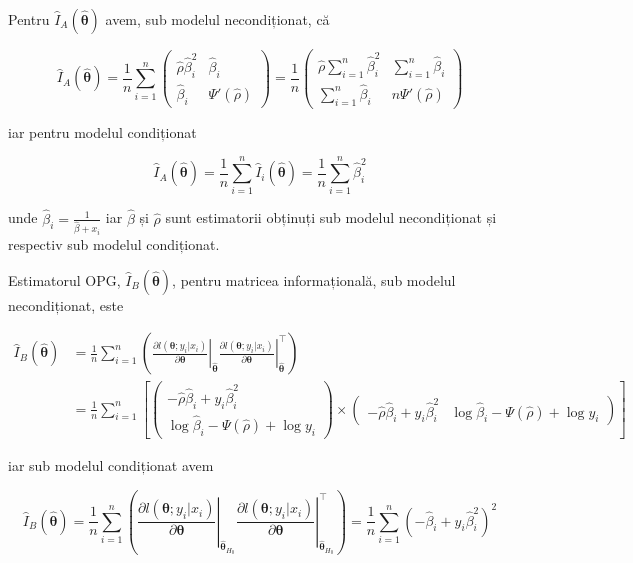 \documentclass[]{article}
\begin{document}
Pentru \(\hat{I}_{A}(\hat{\boldsymbol{\theta}})\) avem, sub modelul
necondiționat, că

\[
\hat{I}_{A}(\hat{\boldsymbol{\theta}}) = \frac{1}{n}\sum_{i = 1}^{n}\begin{pmatrix}\hat{\rho}\hat{\beta}_i^2 & \hat{\beta}_i\\ \hat{\beta}_i & \Psi'(\hat{\rho})\end{pmatrix} = \frac{1}{n}\begin{pmatrix}\hat{\rho}\sum_{i = 1}^{n}\hat{\beta}_i^2 & \sum_{i = 1}^{n}\hat{\beta}_i\\ \sum_{i = 1}^{n}\hat{\beta}_i & n\Psi'(\hat{\rho})\end{pmatrix}
\]

iar pentru modelul condiționat

\[
\hat{I}_{A}(\hat{\boldsymbol{\theta}}) = \frac{1}{n}\sum_{i = 1}^{n}\hat{I}_{i}(\hat{\boldsymbol{\theta}}) = \frac{1}{n}\sum_{i = 1}^{n} \hat{\beta}_{i}^2
\]

unde \(\hat{\beta}_i = \frac{1}{\hat{\beta} + x_i}\) iar \(\hat{\beta}\)
și \(\hat{\rho}\) sunt estimatorii obținuți sub modelul necondiționat și
respectiv sub modelul condiționat.

Estimatorul OPG, \(\hat{I}_{B}(\hat{\boldsymbol{\theta}})\), pentru
matricea informațională, sub modelul necondiționat, este

\begin{align*}
\hat{I}_{B}(\hat{\boldsymbol{\theta}}) &= \frac{1}{n}\sum_{i=1}^{n}\left(\left.\frac{\partial l(\boldsymbol{\theta};y_i|x_i)}{\partial \boldsymbol{\theta}}\right\rvert_{\hat{\boldsymbol{\theta}}}\left.\frac{\partial l(\boldsymbol{\theta};y_i|x_i)}{\partial \boldsymbol{\theta}}\right\rvert_{\hat{\boldsymbol{\theta}}}^\intercal\right) \\
  &= \frac{1}{n}\sum_{i = 1}^{n}\left[\begin{pmatrix}-\hat{\rho}\hat{\beta}_i + y_i\hat{\beta}_i^2 \\ \log{\hat{\beta}_i} - \Psi(\hat{\rho}) + \log{y_i}\end{pmatrix} \times \begin{pmatrix}-\hat{\rho}\hat{\beta}_i + y_i\hat{\beta}_i^2 & \log{\hat{\beta}_i} - \Psi(\hat{\rho}) + \log{y_i}\end{pmatrix}\right]
\end{align*}

iar sub modelul condiționat avem

\[
\hat{I}_{B}(\hat{\boldsymbol{\theta}}) = \frac{1}{n}\sum_{i=1}^{n}\left(\left.\frac{\partial l(\boldsymbol{\theta};y_i|x_i)}{\partial \boldsymbol{\theta}}\right\rvert_{\hat{\boldsymbol{\theta}}_{H_0}}\left.\frac{\partial l(\boldsymbol{\theta};y_i|x_i)}{\partial \boldsymbol{\theta}}\right\rvert_{\hat{\boldsymbol{\theta}}_{H_0}}^\intercal\right) = \frac{1}{n}\sum_{i = 1}^{n} \left(-\hat{\beta}_i + y_i\hat{\beta}_i^2\right)^2
\]
\end{document}
